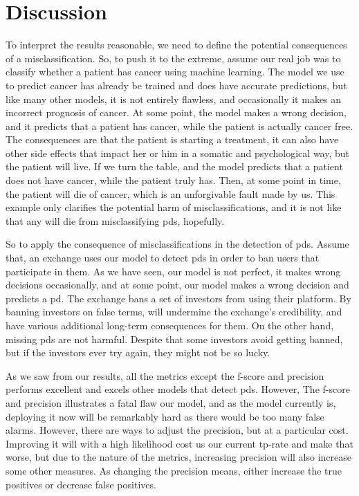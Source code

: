 \newpage
\section{Discussion}
To interpret the results reasonable, we need to define the potential consequences of a misclassification. So, to push it to the extreme, assume our real job was to classify whether a patient has cancer using machine learning. The model we use to predict cancer has already be trained and does have accurate predictions, but like many other models, it is not entirely flawless, and occasionally it makes an incorrect prognosis of cancer. At some point, the model makes a wrong decision, and it predicts that a patient has cancer, while the patient is actually cancer free. The consequences are that the patient is starting a treatment, it can also have other side effects that impact her or him in a somatic and psychological way, but the patient will live. If we turn the table, and the model predicts that a patient does not have cancer, while the patient truly has. Then, at some point in time, the patient will die of cancer, which is an unforgivable fault made by us. This example only clarifies the potential harm of misclassifications, and it is not like that any will die from misclassifying \acp{pd}, hopefully.

So to apply the consequence of misclassifications in the detection of \acp{pd}. Assume that, an exchange uses our model to detect \acp{pd} in order to ban users that participate in them. As we have seen, our model is not perfect, it makes wrong decisions occasionally, and at some point, our model makes a wrong decision and predicts a \ac{pd}. The exchange bans a set of investors from using their platform. By banning investors on false terms, will undermine the exchange's credibility, and have various additional long-term consequences for them. On the other hand, missing \acp{pd} are not harmful. Despite that some investors avoid getting banned, but if the investors ever try again, they might not be so lucky.

As we saw from our results, all the metrics except the f-score and precision performs excellent and excels other models that detect \acp{pd}. However, The f-score and precision illustrates a fatal flaw our model, and as the model currently is, deploying it now will be remarkably hard as there would be too many false alarms. However, there are ways to adjust the precision, but at a particular cost. Improving it will with a high likelihood cost us our current tp-rate and make that worse, but due to the nature of the metrics, increasing precision will also increase some other measures. As changing the precision means, either increase the true positives or decrease false positives.

